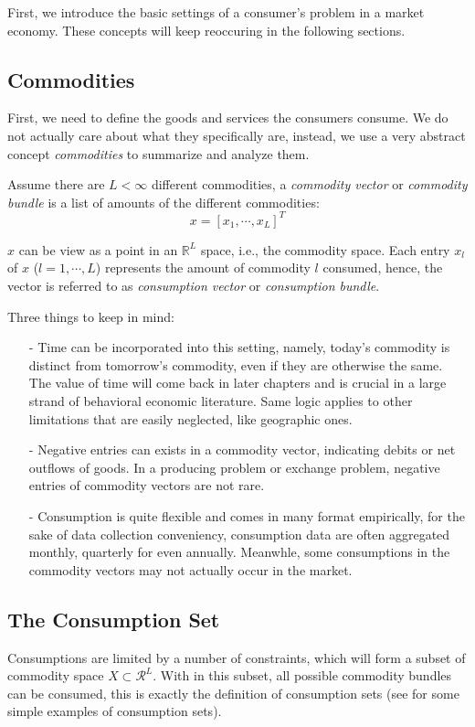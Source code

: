 First, we introduce the basic settings of a consumer's problem in a market economy. These concepts will keep reoccuring in the following sections.

\subsection{Commodities}
First, we need to define the goods and services the consumers consume. We do not actually care about what they specifically are, instead, we use a very abstract concept \textit{commodities}
to summarize and analyze them.
\begin{definition}
    Assume there are $L<\infty$ different commodities, a \textit{commodity vector} or \textit{commodity bundle} is a list of amounts of the different commodities:$$x=\left[x_1,\cdots,x_L\right]^T$$
\end{definition}
$x$ can be view as a point in an $\mathbb{R}^L$ space, i.e., the commodity space. Each entry $x_l$ of $x$ ($l=1,\cdots,L$) represents the amount of commodity $l$ consumed, hence, the vector is referred to
as \textit{consumption vector} or \textit{consumption bundle}.

Three things to keep in mind:
\begin{enumerate}
    \item[-] Time can be incorporated into this setting, namely, today's commodity is distinct from tomorrow's commodity, even if they are otherwise the same. The value of time will come back in later chapters and is crucial in a large strand of behavioral economic literature. Same logic applies to other limitations that are easily neglected, like geographic ones.
    \item[-] Negative entries can exists in a commodity vector, indicating debits or net outflows of goods. In a producing problem or exchange problem, negative entries of commodity vectors are not rare.
    \item[-] Consumption is quite flexible and comes in many format empirically, for the sake of data collection conveniency, consumption data are often aggregated monthly, quarterly for even annually. Meanwhle, some consumptions in the commodity vectors may not actually occur in the market.
\end{enumerate}

\subsection{The Consumption Set}
Consumptions are limited by a number of constraints, which will form a subset of commodity space $X\subset \mathcal{R}^L$. With in this subset, all possible commodity bundles can be 
consumed, this is exactly the definition of consumption sets (see \citet[Page 19-20]{mas1995microeconomic} for some simple examples of consumption sets).


